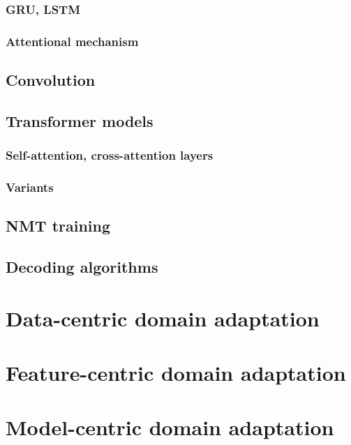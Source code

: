\subsection{GRU, LSTM}

\subsection{Attentional mechanism}
\section{Convolution }
\section{Transformer models}
\subsection{Self-attention, cross-attention layers}
\subsection{Variants}
\section{NMT training}
\section{Decoding algorithms}
\chapter{Data-centric domain adaptation}
\chapter{Feature-centric domain adaptation}
\chapter{Model-centric domain adaptation}